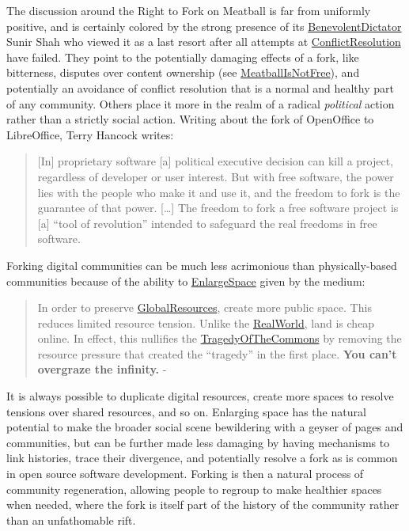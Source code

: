 \documentclass[10pt]{article}
\begin{document}
\begin{multicols}{2}
The discussion around the Right to Fork on Meatball is far from
uniformly positive, and is certainly colored by the strong presence of
its
\href{http://meatballwiki.org/wiki/BenevolentDictator}{BenevolentDictator}
Sunir Shah who viewed it as a last resort after all attempts at
\href{http://meatballwiki.org/wiki/ConflictResolution}{ConflictResolution}
have failed. They point to the potentially damaging effects of a fork,
like bitterness, disputes over content ownership (see
\href{http://meatballwiki.org/wiki/MeatballIsNotFree}{MeatballIsNotFree}),
and potentially an avoidance of conflict resolution that is a normal and
healthy part of any community. Others place it more in the realm of a
radical \emph{political} action rather than a strictly social action.
Writing about the fork of OpenOffice to LibreOffice, Terry Hancock
writes:

\begin{quote}
{[}In{]} proprietary software {[}a{]} political executive decision can
kill a project, regardless of developer or user interest. But with free
software, the power lies with the people who make it and use it, and the
freedom to fork is the guarantee of that power. {[}\ldots{]} The freedom
to fork a free software project is {[}a{]} ``tool of revolution''
intended to safeguard the real freedoms in free software. \cite{hancockOpenOfficeOrgDead2010} 
\end{quote}

Forking digital communities can be much less acrimonious than
physically-based communities because of the ability to
\href{http://meatballwiki.org/wiki/EnlargeSpace}{EnlargeSpace} given by
the medium:

\begin{quote}
In order to preserve
\href{http://meatballwiki.org/wiki/GlobalResource}{GlobalResources},
create more public space. This reduces limited resource tension. Unlike
the \href{http://meatballwiki.org/wiki/RealWorld}{RealWorld}, land is
cheap online. In effect, this nullifies the
\href{http://meatballwiki.org/wiki/GlobalResource}{TragedyOfTheCommons}
by removing the resource pressure that created the ``tragedy'' in the
first place. \textbf{You can't overgraze the infinity.} - \cite{MeatballWikiEnlargeSpace} 
\end{quote}

It is always possible to duplicate digital resources, create more spaces
to resolve tensions over shared resources, and so on. Enlarging space
has the natural potential to make the broader social scene bewildering
with a geyser of pages and communities, but can be further made less
damaging by having mechanisms to link histories, trace their divergence,
and potentially resolve a fork as is common in open source software
development. Forking is then a natural process of community
regeneration, allowing people to regroup to make healthier spaces when
needed, where the fork is itself part of the history of the community
rather than an unfathomable rift.


\end{multicols}
\end{document}
